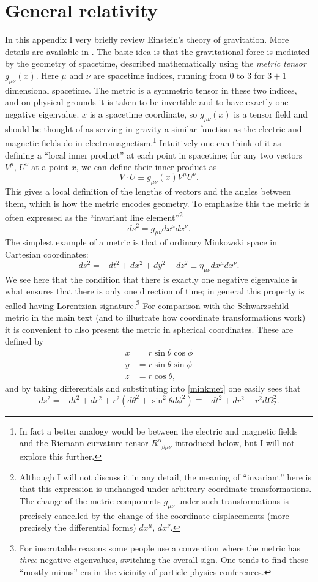 \documentclass[12pt]{article}
\newcommand{\be}{\begin{equation}}
\newcommand{\ee}{\end{equation}}
\begin{document}
\section{General relativity}\label{GRapp}
In this appendix I very briefly review Einstein's theory of gravitation.  More details are available in \cite{Carroll:2004st,Wald:1984rg}. The basic idea is that the gravitational force is mediated by the geometry of spacetime, described mathematically using the \textit{metric tensor} 
$g_{\mu\nu}(x)$.  Here $\mu$ and $\nu$ are spacetime indices, running from $0$ to $3$ for $3+1$ dimensional spacetime.   The metric is a symmetric tensor in these two indices, and on physical grounds it is taken to be invertible and to have exactly one negative eigenvalue. $x$ is a spacetime coordinate, so $g_{\mu\nu}(x)$ is a tensor field and should be thought of as serving in gravity a similar function as the electric and magnetic fields do in electromagnetism.\footnote{In fact a better analogy would be between the electric and magnetic fields and the Riemann curvature tensor $R^\alpha_{\phantom{\alpha}\beta\mu\nu}$ introduced below, but I will not explore this further.}   Intuitively one can think of it as defining a ``local inner product'' at each point in spacetime; for any two vectors $V^\mu$, $U^\nu$ at a point $x$, we can define their inner product as
\be
V\cdot U\equiv g_{\mu\nu} (x)V^\mu U^\nu.
\ee
This gives a local definition of the lengths of vectors and the angles between them, which is how the metric encodes geometry.  To emphasize this the metric is often expressed as the ``invariant line element''\footnote{Although I will not discuss it in any detail, the meaning of ``invariant'' here is that this expression is unchanged under arbitrary coordinate transformations.  The change of the metric components $g_{\mu\nu}$ under such transformations is precisely cancelled by the change of the coordinate displacements (more precisely the differential forms) $dx^\mu$, $dx^\nu$.}
\be
ds^2=g_{\mu\nu}dx^\mu dx^\nu.
\ee
The simplest example of a metric is that of ordinary Minkowski space in Cartesian coordinates:
\be\label{minkmet}
ds^2=-dt^2+dx^2+dy^2+dz^2\equiv \eta_{\mu\nu} dx^\mu dx^\nu.
\ee
We see here that the condition that there is exactly one negative eigenvalue is what ensures that there is only one direction of time; in general this property is called having Lorentzian signature.\footnote{For inscrutable reasons some people use a convention where the metric has \textit{three} negative eigenvalues, switching the overall sign.  One tends to find these ``mostly-minus''-ers in the vicinity of particle physics conferences.}  For comparison with the Schwarzschild metric in the main text (and to illustrate how coordinate transformations work) it is convenient to also present the metric in spherical coordinates.  These are defined by
\begin{align}\nonumber
x&=r\sin\theta\cos\phi\\\nonumber
y&=r\sin\theta \sin \phi\\
z&=r \cos\theta,
\end{align}
and by taking differentials and substituting into \eqref{minkmet} one easily sees that
\be
ds^2=-dt^2+dr^2+r^2\left(d\theta^2+\sin^2\theta d\phi^2\right)\equiv -dt^2+dr^2+r^2 d\Omega_2^2.
\ee
\end{document}
